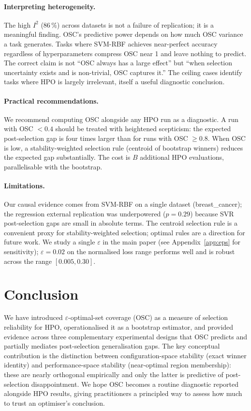 \documentclass[twoside]{article}
\begin{document}
\paragraph{Interpreting heterogeneity.}
The high $I^2$ (86\,\%) across datasets is not a failure of replication;
it is a meaningful finding. OSC's predictive power depends on how much
OSC variance a task generates. Tasks where SVM-RBF achieves near-perfect
accuracy regardless of hyperparameters compress OSC near 1 and leave
nothing to predict. The correct claim is not ``OSC always has a large
effect'' but ``when selection uncertainty exists and is non-trivial,
OSC captures it.'' The ceiling cases identify tasks where HPO is largely
irrelevant, itself a useful diagnostic conclusion.

\paragraph{Practical recommendations.}
We recommend computing OSC alongside any HPO run as a diagnostic.
A run with OSC $< 0.4$ should be treated with heightened scepticism:
the expected post-selection gap is four times larger than for runs with
OSC $\ge 0.8$. When OSC is low, a stability-weighted selection rule
(centroid of bootstrap winners) reduces the expected gap substantially.
The cost is $B$ additional HPO evaluations, parallelisable with the
bootstrap.

\paragraph{Limitations.}
Our causal evidence comes from SVM-RBF on a single dataset
(breast\_cancer); the regression external replication was underpowered
($p = 0.29$) because SVR post-selection gaps are small in absolute
terms. The centroid selection rule is a convenient proxy for
stability-weighted selection; optimal rules are a direction for future
work. We study a single $\varepsilon$ in the main paper (see
Appendix~\ref{app:eps} for sensitivity); $\varepsilon = 0.02$ on the
normalised loss range performs well and is robust across the range
$[0.005, 0.30]$.

\section{Conclusion}
\label{sec:conclusion}

We have introduced $\varepsilon$-optimal-set coverage (OSC) as a
measure of selection reliability for HPO, operationalised it as a
bootstrap estimator, and provided evidence across three complementary
experimental designs that OSC predicts and partially mediates
post-selection generalisation gaps. The key conceptual contribution is
the distinction between configuration-space stability (exact winner
identity) and performance-space stability (near-optimal region
membership): these are nearly orthogonal empirically and only the latter
is predictive of post-selection disappointment. We hope OSC becomes a
routine diagnostic reported alongside HPO results, giving practitioners
a principled way to assess how much to trust an optimiser's conclusion.
\end{document}
